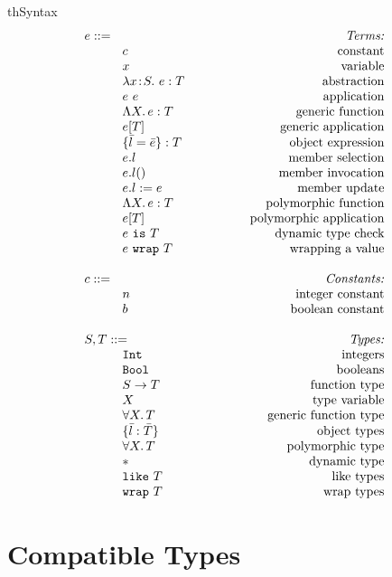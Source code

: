 \documentclass{article}
\newcommand{\mkrefl}[3]{\t{ref}^{#3}~{#1}~#2}
\newcommand{\derefl}[2]{!^{#2}{#1}}
\newcommand{\assignl}[3]{{#1}:=^{#3}{#2}}
\newcommand{\Ref}[1]{\t{Ref}~{#1}}
\newcommand{\lam}[4]{\lambda#1\!:\!#2.\,\,#4:#3}
\newcommand{\lamt}[2]{#1\rightarrow #2}
\newcommand{\app}[2]{#1~#2}
\newcommand{\Int}{\t{Int}}
\newcommand{\Bool}{\t{Bool}}
\newcommand{\dynamic}{\t{*}}
\newcommand{\true}{\t{true}}
\newcommand{\false}{\t{false}}
\newcommand{\Lam}[3]{\Lambda #1.\,#2:#3}
\newcommand{\App}[2]{#1[#2]}
\newcommand{\Forall}[2]{\forall #1.\,#2}
\newcommand{\lett}[4]{\t{letXXX}~{#1}:{#2}={#3}~\t{in}~{#4}}
\newcommand{\cast}[2]{#1~\t{is}~#2}
\renewcommand{\t}[1]{{\tt #1}}
\newcommand{\objty}[1]{\{#1\}}
\newcommand{\obje}[2]{\{#1\}:{#2}}
\newcommand{\objget}[2]{#1.#2}
\newcommand{\objcall}[2]{#1.#2()}
\newcommand{\objset}[3]{#1.#2:=#3}
\newcommand{\wrapty}[1]{\t{wrap}~#1}
\newcommand{\likety}[1]{\t{like}~#1}
\newcommand{\wrap}[2]{#1~\t{wrap}~#2}
\begin{document}
\begin{displayfigure}{th}{\label{fig:syntax}Syntax}
\[
\begin{array}{llr}
	\mydefhead{e ::=\qquad\qquad\qquad\qquad\qquad}{Terms:} 
	\mydefcase{c								}{constant} 
	\mydefcase{x								}{variable} 
	\mydefcase{\lam{x}{S}{T}{e} 				}{abstraction} 
	\mydefcase{\app{e}{e} 					}{application} 
	\mydefcase{\Lam{X}{e}{T}					}{generic function}
	\mydefcase{\App{e}{T}					}{generic application}
	\mydefcase{\obje{\bar{l}=\bar{e}}{T}		}{object expression}
	\mydefcase{\objget{e}{l}					}{member selection}
	\mydefcase{\objcall{e}{l}				}{member invocation}
	\mydefcase{\objset{e}{l}{e}				}{member update}
	\mydefcase{\Lam X e	T					 }{polymorphic function}
	\mydefcase{e[T]							 }{polymorphic application}
	\mydefcase{\cast{e}{T}					}{dynamic type check}
	\mydefcase{\wrap{e}{T}					}{wrapping a value}
\\
	\mydefhead{c ::=}{Constants:} 
	\mydefcase{n								}{integer constant} 
	\mydefcase{b								}{boolean constant} 
\\
	\mydefhead{S,T::=}{Types:} 
	\mydefcase{\Int 							}{integers}
	\mydefcase{\Bool							}{booleans}
	\mydefcase{\lamt{S}{T} 					}{function type}
	\mydefcase{X								}{type variable}
	\mydefcase{\Forall{X}{T}					}{generic function type}
	\mydefcase{\objty{\bar{l}:\bar{T}}	   	}{object types}
	\mydefcase{\Forall X T					 }{polymorphic type}
	\mydefcase{\dynamic 		    				}{dynamic type}
	\mydefcase{\likety{T}					}{like types}
	\mydefcase{\wrapty{T}					}{wrap types}
\end{array}
\]
\end{displayfigure}


\clearpage
\section{Compatible Types}
\end{document}
